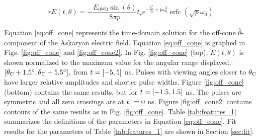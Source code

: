 \documentclass[amsmath,amssymb,aps,prd,10pt,twocolumn]{revtex4}
\DeclareMathOperator\erfc{erfc}
\begin{document}
\begin{equation}
\boxed{
r E(t,\theta) = -\frac{E_0 \omega_0 \sin(\theta)}{8 \pi p} t_r e^{-\frac{t_r^2}{4p} + p \omega_0^2}\erfc(\sqrt{p}\omega_0)
} \label{eq:off_cone}
\end{equation}

Equation \ref{eq:off_cone} represents the time-domain solution for the off-cone $\hat{\theta}$-component of the Askaryan electric field.  Equation \ref{eq:off_cone} is graphed in Figs. \ref{fig:off_cone} and \ref{fig:off_cone2}. In Fig. \ref{fig:off_cone} (top),  $E(t,\theta)$ is shown normalized to the maximum value for the angular range displayed, $[\theta_{\rm C}+1.5^{\circ}, \theta_{\rm C}+5.5^{\circ}]$, from $t_{\rm} = [-5,5]$ ns.  Pulses with viewing angles closer to $\theta_{\rm C}$ have larger relative amplitudes and shorter pulse widths.  Figure \ref{fig:off_cone} (bottom) contains the same results, but for $t_{\rm} = [-1.5,1.5]$ ns.  The pulses are symmetric and all zero crossings are at $t_{\rm r} = 0$ ns.  Figure \ref{fig:off_cone2} contains contours of the same results as in Fig. \ref{fig:off_cone}.  Table \ref{tab:features_1} summarizes the definitions of the parameters in Equation \ref{eq:off_cone}.  Fit results for the parameters of Table \ref{tab:features_1} are shown in Section \ref{sec:fit}.
\end{document}

